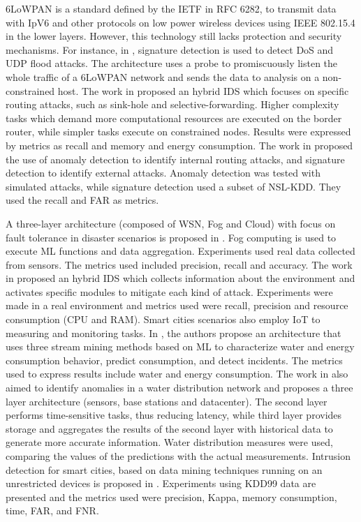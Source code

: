 6LoWPAN is a standard defined by the IETF in RFC 6282, to transmit data with IpV6 and other protocols on low power wireless devices using IEEE 802.15.4 in the lower layers. However, this technology still lacks protection and security mechanisms. %
%
For instance, in \cite{dos-6lowpan-iot}, signature detection is used to detect DoS and UDP flood attacks. The architecture uses a probe to promiscuously listen the whole traffic of a 6LoWPAN network and sends the data to analysis on a non-constrained host.
The work in \cite{SVELTE} proposed an hybrid IDS which focuses on specific routing attacks, such as sink-hole and selective-forwarding. Higher complexity tasks which demand more computational resources are executed on the border router, while simpler tasks execute on constrained nodes. Results were expressed by metrics as recall and memory and energy consumption.
The work in \cite{Hybrid-ids-arch-iot} proposed the use of anomaly detection to identify internal routing attacks, and signature detection to identify external attacks. Anomaly detection was tested with simulated attacks, while signature detection used a subset of NSL-KDD. They used the recall and FAR as metrics. 


A three-layer architecture (composed of WSN, Fog and Cloud) with focus on fault tolerance in disaster scenarios is proposed in \cite{Fault-tolerance-disaster}. Fog computing is used to execute ML functions and data aggregation. Experiments used real data collected from sensors. The metrics used included precision, recall and accuracy.
%
The work in \cite{Kalis} proposed an hybrid IDS which collects information about the environment and activates specific modules to mitigate each kind of attack. Experiments were made in a real environment and metrics used were recall, precision and resource consumption (CPU and RAM).
%
Smart cities scenarios also employ IoT to measuring and monitoring tasks. %
In \cite{IoT-arch-smartmeter}, the authors propose an architecture that uses three stream mining methods based on ML to characterize water and energy consumption behavior, predict consumption, and detect incidents. The metrics used to express results include water and energy consumption.
%
The work in \cite{scalable-anomaly-detection-smart-city} also aimed to identify anomalies in a water distribution network and proposes a three layer architecture (sensors, base stations and datacenter). The second layer performs time-sensitive tasks, thus reducing latency, while third layer provides storage and aggregates the results of the second layer with historical data to generate more accurate information.
Water distribution measures were used, comparing the values of the predictions with the actual measurements.
%
Intrusion detection for smart cities, based on data mining techniques running on an unrestricted devices is proposed in  \cite{DS-based-IDS-SmartGrid}. 
Experiments using KDD99 data are presented and the metrics used were precision, Kappa, memory consumption, time, FAR, and FNR.



